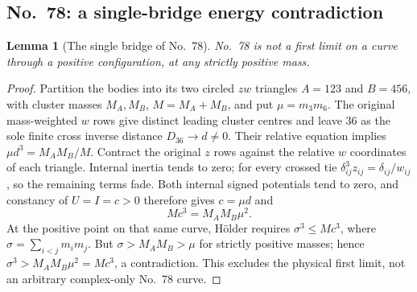 \documentclass[11pt]{amsart}
\newtheorem{lemma}[theorem]{Lemma}
\theoremstyle{remark}
\begin{document}
\subsection{No.~78: a single-bridge energy contradiction}
\begin{lemma}[The single bridge of No.~78]\label{lem:reported-no78}
No.~78 is not a first limit on a curve through a positive configuration, at any strictly positive mass.
\end{lemma}
\begin{proof}
Partition the bodies into its two circled $zw$ triangles $A=123$ and $B=456$, with cluster masses $M_A,M_B$, $M=M_A+M_B$, and put $\mu=m_3m_6$. The original mass-weighted $w$ rows give distinct leading cluster centres and leave $36$ as the sole finite cross inverse distance $D_{36}\to d\ne0$. Their relative equation implies $\mu d^3=M_AM_B/M$. Contract the original $z$ rows against the relative $w$ coordinates of each triangle. Internal inertia tends to zero; for every crossed tie $\delta_{ij}^3z_{ij}=\delta_{ij}/w_{ij}$, so the remaining terms fade. Both internal signed potentials tend to zero, and constancy of $U=I=c>0$ therefore gives $c=\mu d$ and
\begin{equation}\label{eq:no78-bridge-energy}
Mc^3=M_AM_B\mu^2.
\end{equation}
At the positive point on that same curve, H\"older requires $\sigma^3\le Mc^3$, where $\sigma=\sum_{i<j}m_im_j$. But $\sigma>M_AM_B>\mu$ for strictly positive masses; hence $\sigma^3>M_AM_B\mu^2=Mc^3$, a contradiction. This excludes the physical first limit, not an arbitrary complex-only No.~78 curve.
\end{proof}
\end{document}
